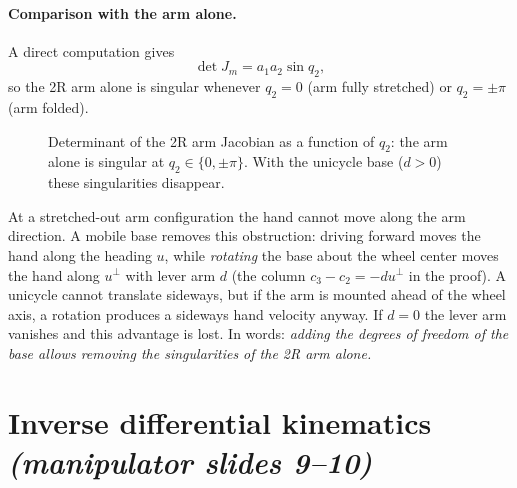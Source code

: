 \documentclass[11pt,a4paper]{article}
\def\bm#1{#1}%
\newcommand{\Jarm}{\bm{J}_m}
\theoremstyle{definition}
\theoremstyle{plain}
\theoremstyle{remark}
\begin{document}
\paragraph{Comparison with the arm alone.} A direct computation gives
\[
\det\Jarm=a_1a_2\sin q_2 ,
\]
so the 2R arm alone is singular whenever $q_2=0$ (arm fully stretched) or $q_2=\pm\pi$ (arm folded).

\begin{figure}[ht]
\centering
{}
\caption{Determinant of the 2R arm Jacobian as a function of $q_2$: the arm alone is singular at $q_2\in\{0,\pm\pi\}$. With the unicycle base ($d>0$) these singularities disappear.}
\end{figure}

\begin{intuition}
At a stretched-out arm configuration the hand cannot move along the arm direction. A mobile base removes this obstruction: driving forward moves the hand along the heading $\bm u$, while \emph{rotating} the base about the wheel center moves the hand along $\bm u^\perp$ with lever arm $d$ (the column $\bm c_3-\bm c_2=-d\bm u^\perp$ in the proof). A unicycle cannot translate sideways, but if the arm is mounted ahead of the wheel axis, a rotation produces a sideways hand velocity anyway. If $d=0$ the lever arm vanishes and this advantage is lost. In words: \emph{adding the degrees of freedom of the base allows removing the singularities of the 2R arm alone.}
\end{intuition}

\section{Inverse differential kinematics \emph{(manipulator slides 9--10)}}
\end{document}
